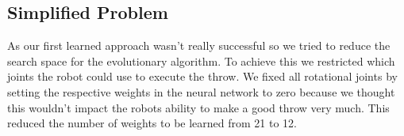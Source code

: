 \subsection{Simplified Problem}
As our first learned approach wasn't really successful so we tried to reduce the search space for the evolutionary algorithm.
To achieve this we restricted which joints the robot could use to execute the throw.
We fixed all rotational joints by setting the respective weights in the neural network to zero because we thought this wouldn't impact the robots ability to make a good throw very much.
This reduced the number of weights to be learned from 21 to 12.